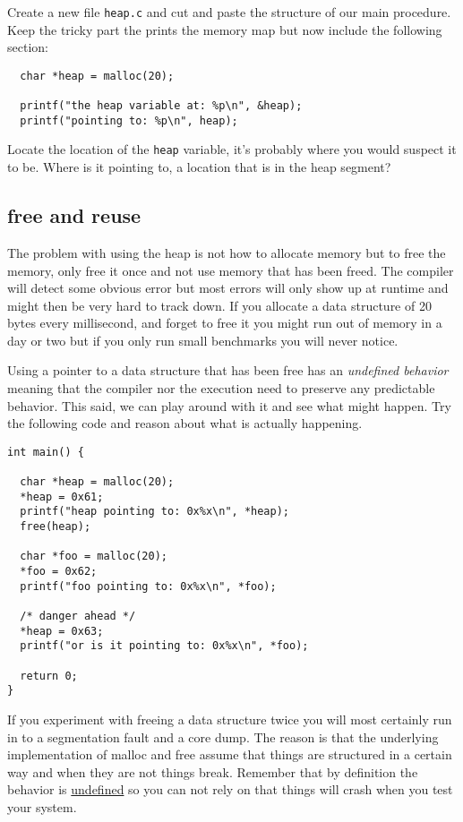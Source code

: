 \documentclass[a4paper,11pt]{article}
\begin{document}
Create a new file {\tt heap.c} and cut and paste the structure of our
main procedure. Keep the tricky part the prints the memory map but now
include the following section:

\begin{lstlisting}
  char *heap = malloc(20);
  
  printf("the heap variable at: %p\n", &heap);
  printf("pointing to: %p\n", heap);      
\end{lstlisting}

Locate the location of the {\tt heap} variable, it's probably where
you would suspect it to be. Where is it pointing to, a location that
is in the heap segment? 

\subsection{free and reuse}

The problem with using the heap is not how to allocate memory but to
free the memory, only free it once and not use memory that has been
freed. The compiler will detect some obvious error but most errors
will only show up at runtime and might then be very hard to track
down. If you allocate a data structure of 20 bytes every millisecond,
and forget to free it you might run out of memory in a day or two but
if you only run small benchmarks you will never notice.

Using a pointer to a data structure that has been free has an {\em
  undefined behavior} meaning that the compiler nor the execution
need to preserve any predictable behavior. This said, we can play
around with it and see what might happen. Try the following code and
reason about what is actually happening.

\begin{lstlisting}
int main() {

  char *heap = malloc(20);
  *heap = 0x61;
  printf("heap pointing to: 0x%x\n", *heap);      
  free(heap);

  char *foo = malloc(20);
  *foo = 0x62;
  printf("foo pointing to: 0x%x\n", *foo);

  /* danger ahead */
  *heap = 0x63;
  printf("or is it pointing to: 0x%x\n", *foo);      

  return 0;
}  
\end{lstlisting}

If you experiment with freeing a data structure twice you will most
certainly run in to a segmentation fault and a core dump. The reason
is that the underlying implementation of malloc and free assume that
things are structured in a certain way and when they are not things
break. Remember that by definition the behavior is
\underline{undefined} so you can not rely on that things will crash
when you test your system.
\end{document}
